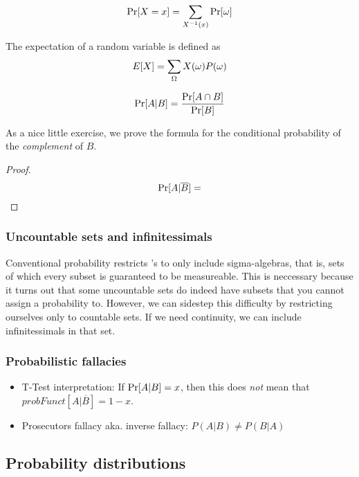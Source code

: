 $$ \operatorname{Pr}[X=x] = \sum_{X^{-1}(x)} \operatorname{Pr}[\omega]$$

\begin{definition}[Expectation]
    The expectation of a random variable is defined as 
    $$ E[X] = \sum_{\Omega} X(\omega)P(\omega)$$ 
\end{definition}

\begin{definition}
    $$ \operatorname{Pr}[A | B] = \frac{\operatorname{Pr}[A \cap B]}{\operatorname{Pr}[B]}$$
\end{definition}

As a nice little exercise, we prove the formula for the conditional probability of the \emph{complement} of $B$.

\begin{proof}
    $$ \operatorname{Pr}[A | \overline{B}] = $$
\end{proof}



\subsubsection{Uncountable sets and infinitessimals}

Conventional probability restricts \samplespace 's to only include sigma-algebras, that is, sets of which every subset is guaranteed to be measureable. This is neccessary because it turns out that some uncountable sets do indeed have subsets that you cannot assign a probability to. However, we can sidestep this difficulty by restricting ourselves only to countable sets. If we need continuity, we can include infinitessimals in that set.

 
 
 
 
 \subsubsection{Probabilistic fallacies}
 \begin{itemize}
     \item T-Test interpretation: If $\operatorname{Pr}[A|B] = x$, then this does \emph{not} mean that $probFunct[A|\overline{B}] = 1 - x$.
     \item Prosecutors fallacy aka. inverse fallacy: $P(A|B) \neq P(B|A)$
 \end{itemize}
 

\subsection{Probability distributions}

